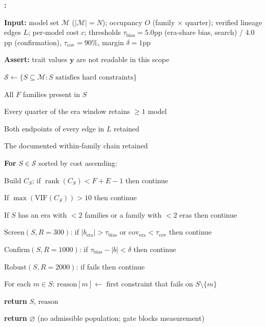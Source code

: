 \documentclass{ieeeaccess}
\theoremstyle{definition}
\theoremstyle{plain}
\newcounter{algstep}
\newenvironment{algsteps}{%
  \footnotesize
  \setcounter{algstep}{0}%
  \begin{list}{\textbf{\thealgstep:}}{%
    \usecounter{algstep}%
    \setlength{\labelwidth}{14pt}%
    \setlength{\labelsep}{4pt}%
    \setlength{\leftmargin}{20pt}%
    \setlength{\rightmargin}{0pt}%
    \setlength{\itemsep}{1pt}%
    \setlength{\parsep}{0pt}%
    \setlength{\topsep}{3pt}%
  }%
}{\end{list}}
\newcommand{\algind}[1]{\hspace*{#1.1em}}
\newcommand{\algkw}[1]{\textbf{#1}}
\begin{document}
\begin{algorithm}[!htbp]
\caption{Outcome-independent study-population design}
\label{alg:g3}
\begin{algsteps}
\item \algkw{Input:} model set $\mathcal{M}$ ($|\mathcal{M}| = N$); occupancy $O$ (family $\times$ quarter); verified lineage edges $L$; per-model cost $c$; thresholds $\tau_{\text{bias}} = 5.0$pp (era-share bias, search) / $4.0$pp (confirmation), $\tau_{\text{cov}} = 90\%$, margin $\delta = 1$pp
\item \algkw{Assert:} trait values $\mathbf{y}$ are not readable in this scope
\item $\mathcal{S} \leftarrow \{S \subseteq \mathcal{M} : S \text{ satisfies hard constraints}\}$
\item \algind{1} All $F$ families present in $S$
\item \algind{1} Every quarter of the era window retains $\geq 1$ model
\item \algind{1} Both endpoints of every edge in $L$ retained
\item \algind{1} The documented within-family chain retained
\item \algkw{For} $S \in \mathcal{S}$ sorted by cost ascending:
\item \algind{1} Build $C_S$; if $\operatorname{rank}(C_S) < F + E - 1$ then continue
\item \algind{1} If $\max(\text{VIF}(C_S)) > 10$ then continue
\item \algind{1} If $S$ has an era with $< 2$ families or a family with $< 2$ eras then continue
\item \algind{1} $\text{Screen}(S, R=300)$: if $|b_{\text{era}}| > \tau_{\text{bias}}$ or $\text{cov}_{\text{era}} < \tau_{\text{cov}}$ then continue
\item \algind{1} $\text{Confirm}(S, R=1000)$: if $\tau_{\text{bias}} - |b| < \delta$ then continue
\item \algind{1} $\text{Robust}(S, R=2000)$: if fails then continue
\item \algind{1} For each $m \in S$: $\text{reason}[m] \leftarrow$ first constraint that fails on $S \setminus \{m\}$
\item \algkw{return} $S$, $\text{reason}$
\item \algkw{return} $\varnothing$ (no admissible population; gate blocks measurement)
\end{algsteps}
\end{algorithm}
\end{document}
